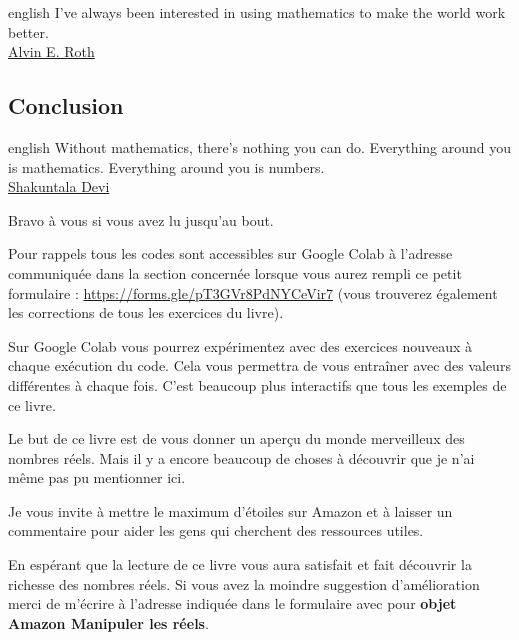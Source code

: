 \documentclass[a4paper, 11pt, twoside]{article}
\begin{document}
\begin{foreigndisplayquote}{english}
I’ve always been interested in using mathematics to make the world
work better.\\

\href{https://en.wikipedia.org/wiki/Alvin\_E.\_Roth}{Alvin E. Roth}
\end{foreigndisplayquote}

\startcontents[level-1]

\subsection{Conclusion}
\label{sec:org92298c5}

\begin{foreigndisplayquote}{english}
Without mathematics, there’s nothing you can do. Everything around
you is mathematics. Everything around you is numbers.\\

\href{https://en.wikipedia.org/wiki/Shakuntala\_Devi}{Shakuntala Devi} 
\end{foreigndisplayquote}

\startcontents[level-2]

Bravo à vous si vous avez lu jusqu'au bout.

Pour rappels tous les codes sont accessibles sur Google Colab à
l'adresse communiquée dans la section concernée lorsque vous
aurez rempli ce petit formulaire :
\url{https://forms.gle/pT3GVr8PdNYCeVir7} (vous trouverez également
les corrections de tous les exercices du livre).

Sur Google Colab vous pourrez expérimentez avec des exercices
nouveaux à chaque exécution du code. Cela vous permettra de vous
entraîner avec des valeurs différentes à chaque fois. C'est beaucoup
plus interactifs que tous les exemples de ce livre.

Le but de ce livre est de vous donner un aperçu du monde merveilleux
des nombres réels. Mais il y a encore beaucoup de choses à découvrir
que je n'ai même pas pu mentionner ici.

Je vous invite à mettre le maximum d'étoiles sur Amazon et à laisser
un commentaire pour aider les gens qui cherchent des ressources utiles.

En espérant que la lecture de ce livre vous aura satisfait et fait
découvrir la richesse des nombres réels. Si vous avez la moindre
suggestion d'amélioration merci de m'écrire à l'adresse
indiquée dans le formulaire avec pour \textbf{objet Amazon Manipuler les réels}.
\stopcontents[level-2]
\stopcontents[level-1]
\end{document}
